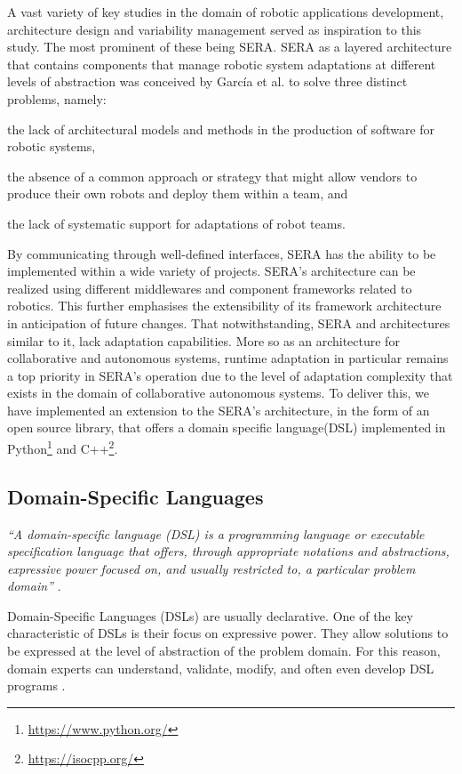 \documentclass[conference]{IEEEtran}
\newcommand{\foot}[1]{\footnote{\url{#1}}}
\begin{document}
A vast variety of key studies in the domain of robotic applications development, architecture design and variability management served as inspiration to this study. The most prominent of these being SERA. SERA as a layered architecture that contains components that manage robotic system adaptations at different levels of abstraction was conceived by Garc\'{i}a et al. \cite{sera} to solve three distinct problems, namely:
\begin{enumerate*}[label=(\roman*)]
	\item the lack of architectural models and methods in the production of software for robotic systems,
	\item the absence of a common approach or strategy that might allow vendors to produce their own robots and deploy them within a team, and
	\item the lack of systematic support for adaptations of robot teams.
\end{enumerate*}

By communicating through well-defined interfaces, SERA has the ability to be implemented within a wide variety of projects. SERA's architecture can be realized using different middlewares and component frameworks related to robotics. This further emphasises the extensibility of its framework architecture in anticipation of future changes.
That notwithstanding, SERA and architectures similar to it, lack adaptation capabilities. More so as an architecture for collaborative and autonomous systems, runtime adaptation in particular remains a top priority in SERA's operation due to the level of adaptation complexity that exists in the domain of collaborative autonomous systems. To deliver this, we have implemented an extension to the SERA's architecture, in the form of an open source library, that offers a domain specific language(DSL) implemented in Python\foot{https://www.python.org/} and C++\foot{https://isocpp.org/}.

\subsection{Domain-Specific Languages}
\textit{``A domain-specific language (DSL) is a programming language or executable specification language that offers, through appropriate notations and abstractions, expressive power focused on, and usually restricted to, a particular problem domain''} \cite{dsl}.

Domain-Specific Languages (DSLs) are usually declarative. One of the key characteristic of DSLs is their focus on expressive power. They allow solutions to be expressed at the level of abstraction of the problem domain. For this reason, domain experts can understand, validate, modify, and often even develop DSL programs \cite{dsl}.
\end{document}
